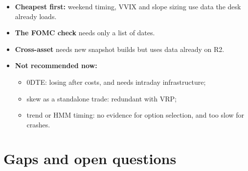 \documentclass{article}
\begin{document}
\begin{itemize}

\item \textbf{Cheapest first:} weekend timing, VVIX and slope sizing use data the desk already loads.

\item \textbf{The FOMC check} needs only a list of dates.

\item \textbf{Cross-asset} needs new snapshot builds but uses data already on R2.

\item \textbf{Not recommended now:}

\begin{itemize}

\item 0DTE: losing after costs, and needs intraday infrastructure;

\item skew as a standalone trade: redundant with VRP;

\item trend or HMM timing: no evidence for option selection, and too slow for crashes.

\end{itemize}

\end{itemize}

\section{Gaps and open questions}
\end{document}
